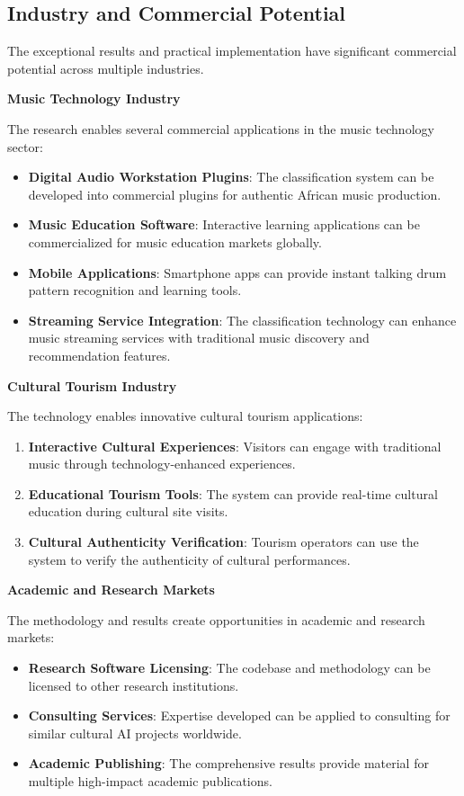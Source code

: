 \documentclass[12pt,a4paper]{article}
\begin{document}
\subsection{Industry and Commercial Potential}

The exceptional results and practical implementation have significant commercial potential across multiple industries.

\textbf{Music Technology Industry}

The research enables several commercial applications in the music technology sector:

\begin{itemize}
\item \textbf{Digital Audio Workstation Plugins}: The classification system can be developed into commercial plugins for authentic African music production.
\item \textbf{Music Education Software}: Interactive learning applications can be commercialized for music education markets globally.
\item \textbf{Mobile Applications}: Smartphone apps can provide instant talking drum pattern recognition and learning tools.
\item \textbf{Streaming Service Integration}: The classification technology can enhance music streaming services with traditional music discovery and recommendation features.
\end{itemize}

\textbf{Cultural Tourism Industry}

The technology enables innovative cultural tourism applications:

\begin{enumerate}
\item \textbf{Interactive Cultural Experiences}: Visitors can engage with traditional music through technology-enhanced experiences.
\item \textbf{Educational Tourism Tools}: The system can provide real-time cultural education during cultural site visits.
\item \textbf{Cultural Authenticity Verification}: Tourism operators can use the system to verify the authenticity of cultural performances.
\end{enumerate}

\textbf{Academic and Research Markets}

The methodology and results create opportunities in academic and research markets:

\begin{itemize}
\item \textbf{Research Software Licensing}: The codebase and methodology can be licensed to other research institutions.
\item \textbf{Consulting Services}: Expertise developed can be applied to consulting for similar cultural AI projects worldwide.
\item \textbf{Academic Publishing}: The comprehensive results provide material for multiple high-impact academic publications.
\end{itemize}
\end{document}
